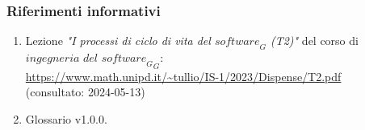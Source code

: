 \subsubsection{Riferimenti informativi}
\begin{enumerate}
    \item Lezione \emph{"I processi di ciclo di vita del $\textit{software}_G$ (T2)"} del corso di $\textit{ingegneria del $\textit{software}_G$}_G$: \\
    \url{https://www.math.unipd.it/~tullio/IS-1/2023/Dispense/T2.pdf}\\
    (consultato: 2024-05-13)
    \item Glossario v1.0.0.
\end{enumerate}